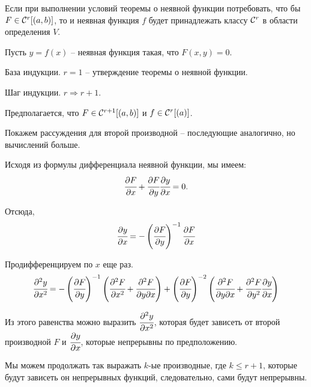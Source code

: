 	\begin{corollary}
		Если при выполнении условий теоремы о неявной функции потребовать, что бы $F\in\mathcal{C}^r[(a,b)]$, то и неявная функция $f$ будет принадлежать классу $\mathcal{C}^r$ в области определения $V$.
	\end{corollary}
	\begin{Proof}
		Пусть $y=f(x)$ -- неявная функция такая, что $F(x, y) = 0$. 
		
		База индукции. $r=1$ -- утверждение теоремы о неявной функции.
		
		Шаг индукции. $r\Rightarrow r+1$.
		
		Предполагается, что $F \in \mathcal{C}^{r+1} [(a,b)]$ и $f \in \mathcal{C}^r[(a)]$.
		
		Покажем рассуждения для второй производной -- последующие аналогично, но вычислений больше. 
		
		Исходя из формулы дифференциала неявной функции, мы имеем:
		$$
			\cfrac {\partial F} {\partial x} + \cfrac {\partial F} {\partial y} \cfrac {\partial y} {\partial x} = 0.
		$$
		
		Отсюда, 
		$$
			\cfrac {\partial y} {\partial x} = - \left(\cfrac {\partial F} {\partial y}\right)^{-1}\cfrac {\partial F} {\partial x}
		$$
		
		Продифференцируем по $x$ еще раз.
		$$
			\cfrac {\partial^2 y} {\partial x^2} = - \left(\cfrac {\partial F} {\partial y}\right)^{-1}\left( \cfrac {\partial^2 F} {\partial x^2} + \cfrac {\partial^2 F} {\partial y \partial x}\right) + \left(\cfrac {\partial F} {\partial y}\right)^{-2} \left( \cfrac {\partial^2 F} {\partial y \partial x} + \cfrac {\partial^2 F} {\partial y^2} \cfrac {\partial y} {\partial x}\right)
		$$
		
		Из этого равенства можно выразить $\cfrac {\partial^2 y} {\partial x^2}$, которая будет зависеть от второй производной $F$ и $\cfrac {\partial y} {\partial x}$, которые непрерывны по предположению. 
		
		Мы можем продолжать так выражать $k$-ые производные, где $k \le r+1$, которые будут зависеть он непрерывных функций, следовательно, сами будут непрерывны.
	\end{Proof}

